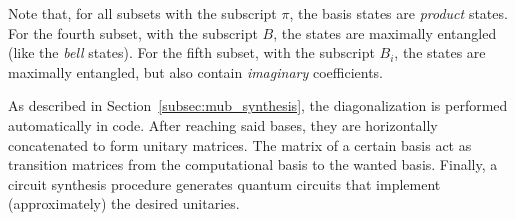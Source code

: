 \documentclass[a4paper,12pt]{article}
\begin{document}
Note that, for all subsets with the subscript $\pi$, the basis states are \emph{product} states.
For the fourth subset, with the subscript $B$, the states are maximally entangled (like the \emph{bell} states).
For the fifth subset, with the subscript $B_i$, the states are maximally entangled, but also contain \emph{imaginary} coefficients.

As described in Section~\ref{subsec:mub_synthesis}, the diagonalization is performed automatically in code.
After reaching said bases, they are horizontally concatenated to form unitary matrices.
The matrix of a certain basis act as transition matrices from the computational basis to the wanted basis.
Finally, a circuit synthesis procedure generates quantum circuits that implement (approximately) the desired unitaries.
\end{document}
